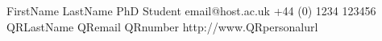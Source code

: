 \documentclass{ecr_card}
\begin{document}
\vcardfront
	{FirstName LastName}
	{PhD Student}
	{email@host.ac.uk}
	{+44 (0) 1234 123456}
	{} %
	{QRLastName}
	{QRemail}
	{QRnumber}
	{http://www.QRpersonalurl}
\end{document}
